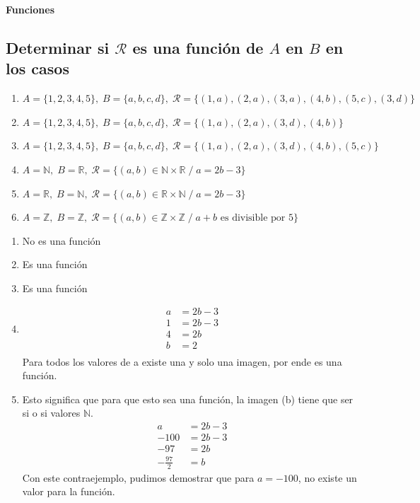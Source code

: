 \documentclass[11pt]{article}
\begin{document}
\textbf{Funciones}
\subsection{Determinar si $\mathcal{R}$ es una función de $A$ en $B$ en los casos}

\begin{enumerate}[label=\roman*)]
    \item $A = \{1,2,3,4,5\}, \; B = \{a,b,c,d\}, \; 
    \mathcal{R} = \{(1,a),(2,a),(3,a),(4,b),(5,c),(3,d)\}$

    \item $A = \{1,2,3,4,5\}, \; B = \{a,b,c,d\}, \; 
    \mathcal{R} = \{(1,a),(2,a),(3,d),(4,b)\}$

    \item $A = \{1,2,3,4,5\}, \; B = \{a,b,c,d\}, \; 
    \mathcal{R} = \{(1,a),(2,a),(3,d),(4,b),(5,c)\}$

    \item $A = \mathbb{N}, \; B = \mathbb{R}, \; 
    \mathcal{R} = \{(a,b) \in \mathbb{N} \times \mathbb{R} \; / \; a = 2b - 3\}$

    \item $A = \mathbb{R}, \; B = \mathbb{N}, \; 
    \mathcal{R} = \{(a,b) \in \mathbb{R} \times \mathbb{N} \; / \; a = 2b - 3\}$

    \item $A = \mathbb{Z}, \; B = \mathbb{Z}, \; 
    \mathcal{R} = \{(a,b) \in \mathbb{Z} \times \mathbb{Z} \; / \; a+b \text{ es divisible por } 5\}$
\end{enumerate}

\begin{enumerate}[label=\roman*)]
    \item No es una función
    \item Es una función
    \item Es una función
    \item \begin{align*}
        a &= 2 b - 3 \\
        1 &=2 b - 3 \\
        4 &= 2b \\
        b &= 2 \\
    \end{align*}
    Para todos los valores de a existe una y solo una imagen, por ende es una función.
    \item Esto significa que para que esto sea una función, la imagen (b) tiene que ser si o si valores $\mathbb{N}$. 
    \begin{align*}
        a &= 2b - 3 \\
        - 100 &= 2b - 3 \\
        - 97 &= 2b \\
       - \frac{97}{2} &= b
    \end{align*}
    Con este contraejemplo, pudimos demostrar que para $a = - 100$, no existe un valor para la función. 
\end{enumerate}
\end{document}
